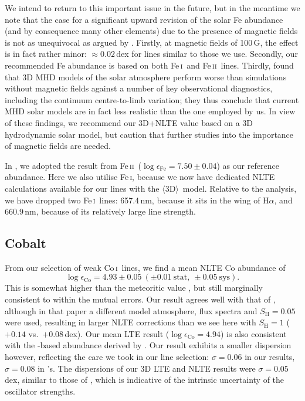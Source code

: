 \documentclass[traditabstract]{aa}
\newcommand{\oneDAV}{$\langle\mathrm{3D}\rangle$}
\newcommand{\altfei}{Fe\,\textsc{i}}
\newcommand{\altfeii}{Fe\,\textsc{ii}}
\newcommand{\altcoi}{Co\,\textsc{i}}
\newcommand{\fei}{\altfei\ }
\newcommand{\feii}{\altfeii\ }
\newcommand{\coi}{\altcoi\ }
\begin{document}
We intend to return to this important issue in the future, but in the meantime we note that the
case for a significant upward revision of the solar Fe abundance (and by consequence many other elements) 
due to the presence of magnetic fields is not as unequivocal as argued by \citet{2010ApJ...724.1536F, 2012A&A...548A..35F}.
Firstly, at magnetic fields of 100\,G, the effect is in fact rather minor: $\approx 0.02$\,dex for lines similar to those we use.
Secondly, our recommended Fe abundance is based on both \fei and \feii lines. Thirdly, 
\citet{2013A&A...554A.118P} found that 3D MHD models of the solar atmosphere perform worse
than simulations without magnetic fields against a number of key observational diagnostics, including
the continuum centre-to-limb variation; they thus conclude that current MHD solar models are in fact 
less realistic than the one employed by us. 
In view of these findings, we recommend our 3D+NLTE value based on a 3D hydrodynamic solar model, 
but caution that further studies into the importance of magnetic fields are needed. 

In , we adopted the result from \feii ($\log \epsilon_\mathrm{Fe}=7.50\pm0.04$) as our reference abundance.  Here we also utilise \altfei, because we now have dedicated NLTE calculations available for our lines with the \oneDAV\ model.  Relative to the  analysis, we have dropped two \fei lines: 
657.4\,nm, because it sits in the wing of H$\alpha$, and 660.9\,nm, because of its relatively large line strength.

\subsection{Cobalt}
\label{Coresults}

From our selection of weak \coi lines, we find a mean NLTE Co abundance of
\begin{displaymath}
\log \epsilon_\mathrm{Co}=4.93\pm0.05\ (\pm0.01\ \mathrm{stat},\ \pm0.05\ \mathrm{sys}).
\end{displaymath}
This is somewhat higher than the meteoritic value \citep[$4.87\pm0.01$;][]{Lodders09}, but still marginally consistent to within the mutual errors.  Our result agrees well with that of \citet[][$4.95\pm0.04$]{Bergemann11}, although in that paper a different model atmosphere, flux spectra and $S_\mathrm{H}=0.05$ were used, resulting in larger NLTE corrections than we see here with $S_\mathrm{H}=1$ ($+0.14$ vs.\ $+0.08$\,dex).  Our mean LTE  result ($\log \epsilon_\mathrm{Co}=4.94$) is also consistent with the -based abundance derived by \citet[][$\log \epsilon_\mathrm{Co}=4.92$]{Cardon82}.  Our result exhibits a smaller dispersion however, reflecting the care we took in our line selection: $\sigma=0.06$ in our  results, $\sigma=0.08$ in \citeauthor{Cardon82}'s.  The dispersions of our 3D LTE and NLTE results were $\sigma=0.05$\,dex, similar to those of \citet{Bergemann10Co}, which is indicative of the intrinsic uncertainty of the oscillator strengths.
\end{document}
